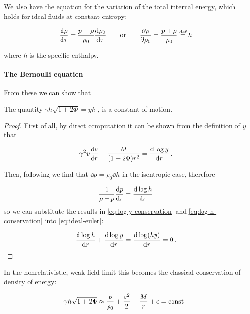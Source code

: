 \documentclass[main.tex]{subfiles}
\begin{document}
We also have the equation for the variation of the total internal energy, which holds for ideal fluids at constant entropy:

\begin{equation} \label{eq:enthalpy-definition}
    \dv{\rho}{\tau} = \frac{p+\rho}{\rho_0} \dv{\rho_0}{\tau}
    \qquad
    \text{or}
    \qquad
    \pdv{\rho}{\rho_0} = \frac{p + \rho}{\rho_0} \defeq h
\end{equation}

where $h$ is the specific enthalpy.

\paragraph{The Bernoulli equation}

From these we can show that

\begin{claim}
  The quantity $\gamma h \sqrt{1+2\Phi} = yh$ , is a constant of motion.
\end{claim}

\begin{proof}
First of all, by direct computation it can be shown from the definition of \(y\) that

\begin{equation} \label{eq:log-y-conservation}
  \gamma^2 v \dv{v}{r} + \frac{M}{(1+ 2 \Phi) r^2} = \dv{\log y }{r} \,.
\end{equation}

Then, following \textcite[section 6.3]{Gourgoulhon:2006bn} we find that \(\dd{p} = \rho_0 \dd{h}\) in the isentropic case, therefore

\begin{equation} \label{eq:log-h-conservation}
  \frac{1}{\rho + p} \dv{p}{r}  =  \dv{\log h}{r}
\end{equation}
so we can substitute the results in \eqref{eq:log-y-conservation} and \eqref{eq:log-h-conservation} into \eqref{eq:ideal-euler}:

\begin{equation}
  \dv{\log h}{r} + \dv{\log y }{r} = \dv{\log (hy) }{r} = 0 \,.
\end{equation}
\end{proof}

In the nonrelativistic, weak-field limit this becomes the classical conservation of density of energy:

\begin{equation}
    \gamma h \sqrt{1+2\Phi} \approx \frac{p}{\rho_0} + \frac{v^2}{2} - \frac{M}{r} + \epsilon = \const \,.
\end{equation}
\end{document}
